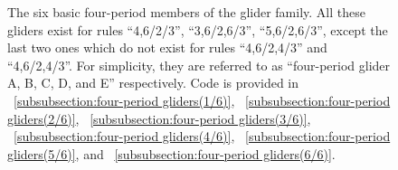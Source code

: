 \documentclass[12pt]{article}
\numberwithin{figure}{section} %
\begin{document}
\begin{figure}[H]
\begin{subfigure}{0.18\textwidth}
     		\subcaption{}
   	\end{subfigure}
      	\newline
   	\setcounter{subfigure}{0}
   	\caption[Four-period gliders]{The six basic four-period members of the glider family. All these gliders exist for rules “4,6/2/3”, “3,6/2,6/3”, “5,6/2,6/3”, except the last two ones which do not exist for rules “4,6/2,4/3” and “4,6/2,4/3”. For simplicity, they are referred to as “four-period glider A, B, C, D, and E” respectively. Code is provided in ~\ref{subsubsection:four-period gliders(1/6)}, ~\ref{subsubsection:four-period gliders(2/6)}, ~\ref{subsubsection:four-period gliders(3/6)}, ~\ref{subsubsection:four-period gliders(4/6)}, ~\ref{subsubsection:four-period gliders(5/6)}, and ~\ref{subsubsection:four-period gliders(6/6)}.}
   	\label{fig:four-period gliders}
   	\vspace{-1.5em}
\end{figure}
\end{document}

